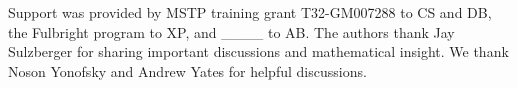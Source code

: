 Support was provided by MSTP training grant T32-GM007288 to CS and DB, the Fulbright program to XP, and \_\_\_\_ to AB. The authors thank Jay Sulzberger for sharing important discussions and mathematical insight. We thank Noson Yonofsky and Andrew Yates for helpful discussions.

